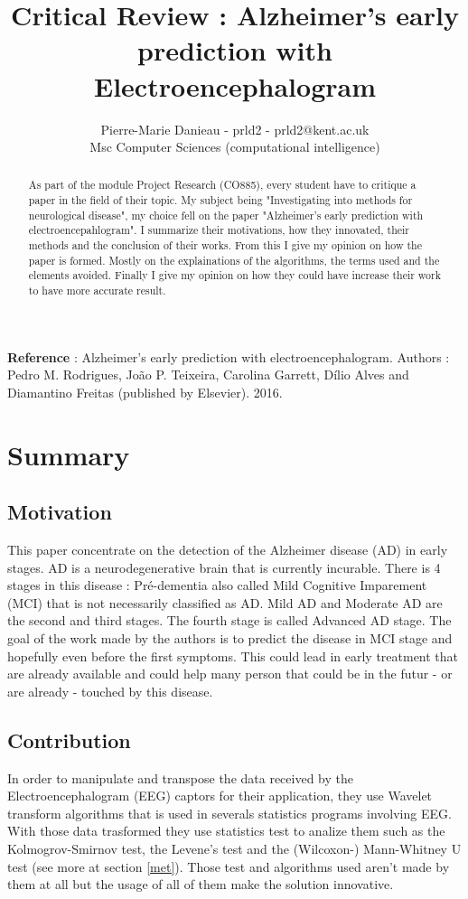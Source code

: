 \documentclass[a4paper, 12pt]{article}
\title{Critical Review : Alzheimer's early prediction with Electroencephalogram}
\author{Pierre-Marie Danieau - prld2 - prld2@kent.ac.uk\\ Msc Computer Sciences (computational intelligence)}
\begin{document}
\maketitle

\begin{abstract}
As part of the module Project Research (CO885), every student have to critique a paper in the field of their topic. My subject being "Investigating into methods for neurological disease", my choice fell on the paper "Alzheimer's early prediction with electroencepahlogram". I summarize their motivations, how they innovated, their methods and the conclusion of their works. From this I give my opinion on how the paper is formed. Mostly on the explainations of the algorithms, the terms used and the elements avoided. Finally I give my opinion on how they could have increase their work to have more accurate result.
\end{abstract}

\textbf{Reference} : Alzheimer's early prediction with electroencephalogram. Authors : Pedro M. Rodrigues, Jo\~ao P. Teixeira, Carolina Garrett, D\'ilio Alves and Diamantino Freitas (published by Elsevier). 2016.

\clearpage


\section{Summary}
\subsection{Motivation} \label{mot}
This paper concentrate on the detection of the Alzheimer disease (AD) in early stages. AD is a neurodegenerative brain that is currently incurable.
There is 4 stages in this disease : Pré-dementia also called Mild Cognitive Imparement (MCI) that is not necessarily classified as AD. Mild AD and Moderate AD are the second and third stages. The fourth stage is called Advanced AD stage. The goal of the work made by the authors is to predict the disease in MCI stage and hopefully even before the first symptoms. This could lead in early treatment that are already available and could help many person that could be in the futur - or are already - touched by this disease.
\subsection{Contribution} \label{con}
In order to manipulate and transpose the data received by the Electroencephalogram (EEG) captors for their application, they use Wavelet transform algorithms that is used in severals statistics programs involving EEG. With those data trasformed they use statistics test to analize them such as the Kolmogrov-Smirnov test, the Levene's test and the (Wilcoxon-) Mann-Whitney U test (see more at section \ref{met}). Those test and algorithms used aren't made by them at all but the usage of all of them make the solution innovative.
\end{document}

